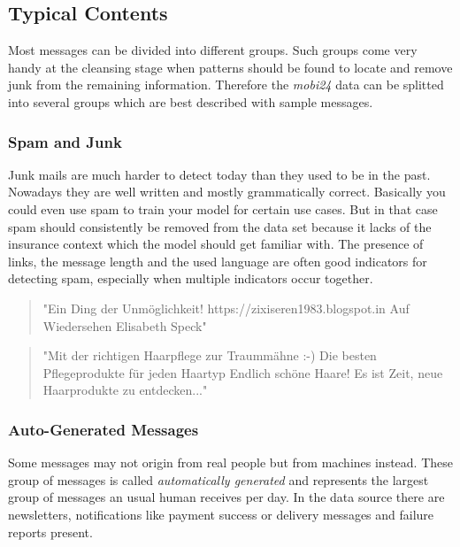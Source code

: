 \subsection{Typical Contents}
\label{chap:typical-contents}

Most messages can be divided into different groups. Such groups come very handy at the cleansing stage when patterns should be found to locate and remove junk from the remaining information. Therefore the \emph{mobi24} data can be splitted into several groups which are best described with sample messages.

\subsubsection{Spam and Junk}

Junk mails are much harder to detect today than they used to be in the past. Nowadays they are well written and mostly grammatically correct. Basically you could even use spam to train your model for certain use cases. But in that case spam should consistently be removed from the data set because it lacks of the insurance context which the model should get familiar with. The presence of links, the message length and the used language are often good indicators for detecting spam, especially when multiple indicators occur together.

\begin{quote}
    "Ein Ding der Unmöglichkeit! https://zixiseren1983.blogspot.in Auf Wiedersehen Elisabeth Speck"
\end{quote}

\begin{quote}
    "Mit der richtigen Haarpflege zur Traummähne :-) Die besten Pflegeprodukte für jeden Haartyp Endlich schöne Haare! Es ist Zeit, neue Haarprodukte zu entdecken..."
\end{quote}

\subsubsection{Auto-Generated Messages}

Some messages may not origin from real people but from machines instead. These group of messages is called \emph{automatically generated} and represents the largest group of messages an usual human receives per day. In the data source there are newsletters, notifications like payment success or delivery messages and failure reports present.

